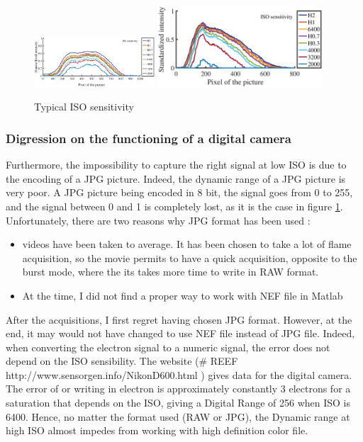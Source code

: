\begin{figure}[!h]
  \centering
\includegraphics[width=0.40\textwidth]
{fig/sensitivity/1D_axy_4069.eps}
 \includegraphics[width=0.55\textwidth]
 {fig/sensitivity/1D_axy_4476.eps}
  \caption{Typical ISO sensitivity}
 \label{fig_Iso_sensitivity_1D}
\end{figure}

\subsubsection{Digression on the functioning of a digital camera}
Furthermore, the impossibility to capture the right signal at low ISO is due to the encoding of a JPG picture. Indeed, the dynamic range of a JPG picture is very poor. A JPG picture being encoded in 8 bit, the signal goes from 0 to 255, and the signal between 0 and 1 is completely lost, as it is the case in figure \ref{fig_Iso_sensitivity_1D}. Unfortunately, there are two reasons why JPG format has been used :
\begin{itemize}
\item videos have been taken to average. It has been chosen to take a lot of flame acquisition, so the movie permits to have a quick acquisition, opposite to the burst mode, where the its takes more time to write in RAW format.
\item At the time, I did not find a proper way to work with NEF file in Matlab
\end{itemize}

After the acquisitions, I first regret having chosen JPG format. However, at the end, it may would not have changed to use NEF file instead of JPG file. Indeed, when converting the electron signal to a numeric signal, the error does not depend on the ISO sensibility. The website (\# REEF http://www.sensorgen.info/NikonD600.html ) gives data for the digital camera. The error of or writing in electron is approximately constantly 3 electrons for a saturation that depends on the ISO, giving a Digital Range of 256 when ISO is 6400. Hence, no matter the format used (RAW or JPG), the Dynamic range at high ISO almost impedes from working with high definition color file.


